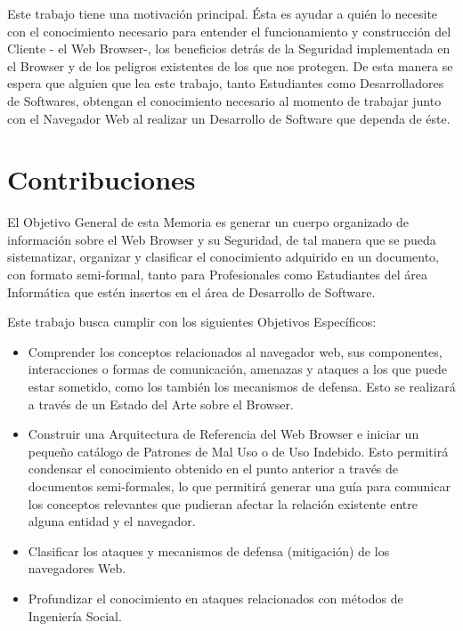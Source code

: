 Este trabajo tiene una motivación principal. Ésta es ayudar a quién lo necesite con el conocimiento necesario para entender el funcionamiento y construcción del Cliente - el Web Browser-, los beneficios detrás de la Seguridad implementada en el Browser y de los peligros existentes de los que nos protegen. De esta manera se espera que alguien que lea este trabajo, tanto Estudiantes como Desarrolladores de Softwares, obtengan el conocimiento necesario al momento de trabajar junto con el Navegador Web al realizar un Desarrollo de Software que dependa de éste.



\section{Contribuciones}
\label{chap1:contr}

El Objetivo General de esta Memoria es generar un cuerpo organizado de información sobre el Web Browser y su Seguridad, de tal manera que se pueda sistematizar, organizar y clasificar el conocimiento adquirido en un documento, con formato semi-formal, tanto para Profesionales como Estudiantes del área Informática que estén insertos en el área de Desarrollo de Software. 

Este trabajo busca cumplir con los siguientes Objetivos Específicos:

\begin{itemize}
	\item Comprender los conceptos relacionados al navegador web, sus componentes, interacciones o formas de comunicación, amenazas y ataques a los que puede estar sometido, como los también los mecanismos de defensa. Esto se realizará a través de un Estado del Arte sobre el Browser.
	\item Construir una Arquitectura de Referencia del Web Browser e iniciar un pequeño catálogo de Patrones de Mal Uso o de Uso Indebido. Esto permitirá condensar el conocimiento obtenido en el punto anterior a través de documentos semi-formales, lo que permitirá generar una guía para comunicar los conceptos relevantes que pudieran afectar la relación existente entre alguna entidad y el navegador.
	\item Clasificar los ataques y mecanismos de defensa (mitigación) de los navegadores Web. %
	\item Profundizar el conocimiento en ataques relacionados con métodos de Ingeniería Social.
	
\end{itemize} 

